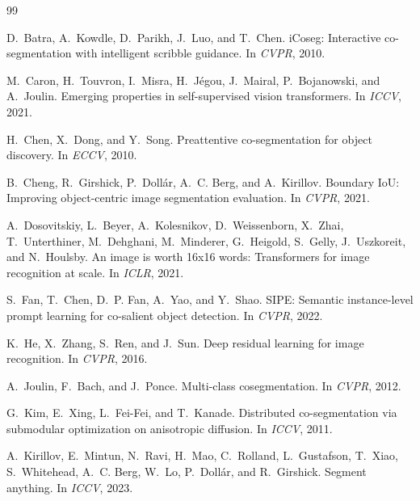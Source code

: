 \documentclass[10pt,twocolumn,letterpaper]{article}
\begin{document}
\begingroup
\small
\begin{thebibliography}{99}

D.~Batra, A.~Kowdle, D.~Parikh, J.~Luo, and T.~Chen.
\newblock iCoseg: Interactive co-segmentation with intelligent scribble guidance.
\newblock In \emph{CVPR}, 2010.

M.~Caron, H.~Touvron, I.~Misra, H.~Jégou, J.~Mairal, P.~Bojanowski, and
A.~Joulin.
\newblock Emerging properties in self-supervised vision transformers.
\newblock In \emph{ICCV}, 2021.

H.~Chen, X.~Dong, and Y.~Song.
\newblock Preattentive co-segmentation for object discovery.
\newblock In \emph{ECCV}, 2010.

B.~Cheng, R.~Girshick, P.~Dollár, A.~C. Berg, and A.~Kirillov.
\newblock Boundary IoU: Improving object-centric image segmentation evaluation.
\newblock In \emph{CVPR}, 2021.

A.~Dosovitskiy, L.~Beyer, A.~Kolesnikov, D.~Weissenborn, X.~Zhai,
T.~Unterthiner, M.~Dehghani, M.~Minderer, G.~Heigold, S.~Gelly, J.~Uszkoreit,
and N.~Houlsby.
\newblock An image is worth 16x16 words: Transformers for image recognition at
scale.
\newblock In \emph{ICLR}, 2021.

S.~Fan, T.~Chen, D.~P. Fan, A.~Yao, and Y.~Shao.
\newblock SIPE: Semantic instance-level prompt learning for co-salient object
detection.
\newblock In \emph{CVPR}, 2022.

K.~He, X.~Zhang, S.~Ren, and J.~Sun.
\newblock Deep residual learning for image recognition.
\newblock In \emph{CVPR}, 2016.

A.~Joulin, F.~Bach, and J.~Ponce.
\newblock Multi-class cosegmentation.
\newblock In \emph{CVPR}, 2012.

G.~Kim, E.~Xing, L.~Fei-Fei, and T.~Kanade.
\newblock Distributed co-segmentation via submodular optimization on anisotropic
diffusion.
\newblock In \emph{ICCV}, 2011.

A.~Kirillov, E.~Mintun, N.~Ravi, H.~Mao, C.~Rolland, L.~Gustafson,
T.~Xiao, S.~Whitehead, A.~C. Berg, W.~Lo, P.~Dollár, and R.~Girshick.
\newblock Segment anything.
\newblock In \emph{ICCV}, 2023.


\end{thebibliography}
\end{document}
